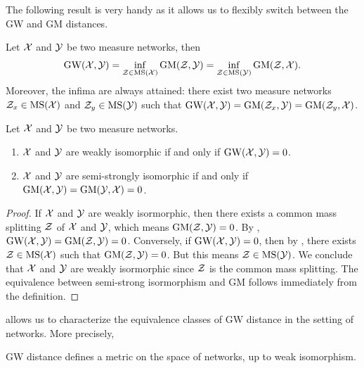 The following result is very handy as it allows us to flexibly switch between the GW and GM distances.
\begin{corollary}
  \label{GW_mGW}
  Let $\mathcal X$ and $\mathcal Y$ be two measure networks, then
  \begin{align}
    \text{GW}(\mathcal X, \mathcal Y) = \inf_{\mathcal Z \in \text{MS}(\mathcal X)} \text{GM}(\mathcal Z, \mathcal Y)
    = \inf_{\mathcal Z \in \text{MS}(\mathcal Y)} \text{GM}(\mathcal Z, \mathcal X).
  \end{align}
  Moreover, the infima are always attained: there exist two measure networks $\mathcal Z_x \in \text{MS}(\mathcal X)$ and
  $\mathcal Z_y \in \text{MS}(\mathcal Y)$ such that
  $\text{GW}(\mathcal X, \mathcal Y) = \text{GM}(\mathcal Z_x, \mathcal Y) = \text{GM}(\mathcal Z_y, \mathcal X)$.
\end{corollary}
\begin{proposition} \label{prop:GW_iso}
  Let $\mathcal X$ and $\mathcal Y$ be two measure networks.
  \begin{enumerate}
    \item $\mathcal X$ and $\mathcal Y$ are weakly isomorphic if and only if $\text{GW}(\mathcal X, \mathcal Y) = 0$.
    \item $\mathcal X$ and $\mathcal Y$ are semi-strongly isomorphic if and only if
    $\text{GM}(\mathcal X, \mathcal Y) = \text{GM}(\mathcal Y, \mathcal X) = 0$.
  \end{enumerate}
\end{proposition}
\begin{proof}
If $\mathcal X$ and $\mathcal Y$ are weakly isormorphic, then there exists a common mass splitting
$\mathcal Z$ of $\mathcal X$ and $\mathcal Y$, which means $\text{GM}(\mathcal Z, \mathcal Y) = 0$. By ,
$\text{GW}(\mathcal X, \mathcal Y) = \text{GM}(\mathcal Z, \mathcal Y) = 0$. Conversely, if $\text{GW}(\mathcal X, \mathcal Y) = 0$,
then by , there exists $\mathcal Z \in \text{MS}(\mathcal X)$ such that $\text{GM}(\mathcal Z, \mathcal Y) = 0$.
But this means $\mathcal Z \in \text{MS}(\mathcal Y)$. We conclude that $\mathcal X$ and $\mathcal Y$ are weakly isormorphic
since $\mathcal Z$ is the common mass splitting. The equivalence between semi-strong isormorphism and
GM follows immediately from the definition.
\end{proof}
 allows us to characterize the equivalence classes of GW distance in the
setting of networks. More precisely,
\begin{proposition}
  GW distance defines a metric on the space of networks, up to weak isomorphism.
\end{proposition}
